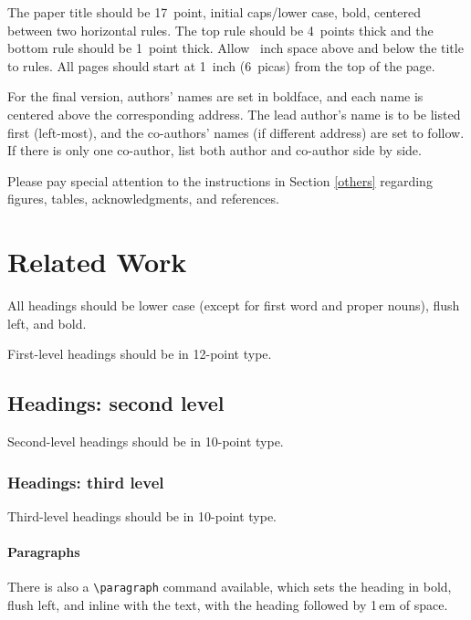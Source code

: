 \documentclass[10pt]{article}
\begin{document}
The paper title should be 17~point, initial caps/lower case, bold, centered
between two horizontal rules. The top rule should be 4~points thick and the
bottom rule should be 1~point thick. Allow ~inch space above and
below the title to rules. All pages should start at 1~inch (6~picas) from the
top of the page.

For the final version, authors' names are set in boldface, and each name is
centered above the corresponding address. The lead author's name is to be listed
first (left-most), and the co-authors' names (if different address) are set to
follow. If there is only one co-author, list both author and co-author side by
side.

Please pay special attention to the instructions in Section \ref{others}
regarding figures, tables, acknowledgments, and references.

\section{Related Work}
\label{headings}

All headings should be lower case (except for first word and proper nouns),
flush left, and bold.

First-level headings should be in 12-point type.

\subsection{Headings: second level}

Second-level headings should be in 10-point type.

\subsubsection{Headings: third level}

Third-level headings should be in 10-point type.

\paragraph{Paragraphs}

There is also a \verb+\paragraph+ command available, which sets the heading in
bold, flush left, and inline with the text, with the heading followed by 1\,em
of space.
\end{document}
